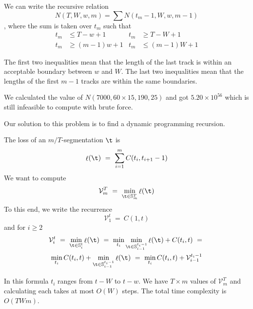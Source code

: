 \documentclass[twocolumn]{article}
\DeclareMathOperator{\loss}{\ell}
\newcommand{\segs}{\mathbb S}
\newcommand{\best}{\mathcal V}
\begin{document}
	We can write the recursive relation $$N(T,W,w,m) = \sum N(t_m-1,W,w,m-1)$$, where the sum is taken over $t_m$ such that 
	\begin{align*}
		t_m &\le T-w+1 & t_m &\ge T-W+1\\
		t_m &\ge (m-1)w+1 & t_m &\le (m-1)W+1
	\end{align*}
	
	The first two inequalities mean that the length of the last track is within an acceptable boundary between $w$ and $W$. The last two inequalities mean that the lengths of the first $m-1$ tracks are within the same boundaries. 
	
	We calculated the value of $N(7000, 60\times15, 190, 25)$ and got $5.20 \times 10^{56}$ which is still infeasible to compute with brute force.
	
	
	
	Our solution to this problem is to find a dynamic programming recursion.
	
	The loss of an $m/T$-segmentation $\t$ is 
	\[
	\loss(\t) 
	~=~
	\sum_{i=1}^m C(t_i, t_{i+1}-1)
	\]
	We want to compute
	\[
	\best^T_m ~=~ \min_{\t \in \segs^T_m} \loss(\t)
	\]
	To this end, we write the recurrence
	\begin{equation*}
		\best^t_1 ~=~ C(1, t) 
	\end{equation*}
	and for $i\ge2$
	\begin{multline*}
		\best^t_i ~=~
		\min_{\t \in \segs^t_i} \loss(\t)
		~=~ \min_{t_i} \min_{\t \in \segs^{t_i-1}_{i-1}} \loss(\t) + C(t_i, t)~=~  \\
		\min_{t_i} C(t_i, t) + \min_{\t \in \segs^{t_i-1}_{i-1}} \loss(\t) 
		~=~ \min_{t_i} C(t_i, t) + \best^{t_i-1}_{i-1}
	\end{multline*}
	
	In this formula $t_i$ ranges from $t-W$ to $t-w$. We have $T \times m$ values of $\best^T_m$ and calculating each takes at most $O(W)$ steps. The total time complexity is $O(TWm)$.
	
\end{document}
